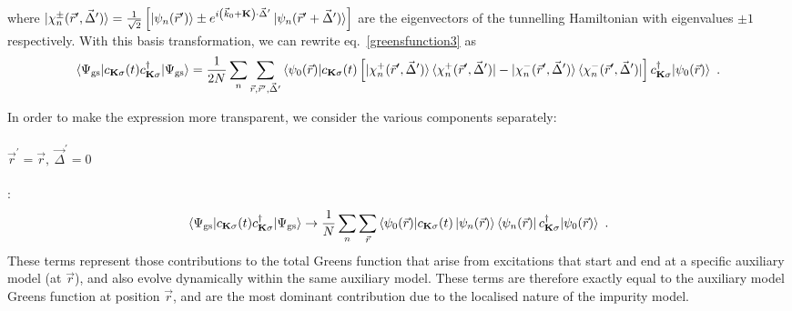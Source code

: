 \documentclass[reprint,hidelinks,onecolumn]{revtex4-2}
\begin{document}
where \(\ket{\chi_n^\pm(\vec r^\prime,\vec\Delta^\prime)} = \frac{1}{\sqrt 2}\left[\ket{\psi_n(\vec r^\prime)} \pm e^{i\left( \vec k_0 + {\bf K} \right) \cdot\vec\Delta^\prime}\ket{\psi_n(\vec r^\prime + \vec\Delta^\prime)}\right] \) are the eigenvectors of the tunnelling Hamiltonian with eigenvalues \(\pm 1\) respectively. With this basis transformation, we can rewrite eq.~\ref{greensfunction3} as
\begin{equation}\begin{aligned}
		\braket{\Psi_\text{gs} | c_{{\bf K}\sigma}(t) c^\dagger_{{\bf K}\sigma} | \Psi_\text{gs}} = \frac{1}{2N}\sum_n\sum_{\vec r,\vec r^\prime,\vec \Delta^\prime} \braket{\psi_{0}(\vec r) | c_{{\bf K}\sigma}(t) \left[ \ket{\chi_n^+(\vec r^\prime,\vec\Delta^\prime)}\bra{\chi_n^+(\vec r^\prime,\vec\Delta^\prime)} - \ket{\chi_n^-(\vec r^\prime,\vec\Delta^\prime)}\bra{\chi_n^-(\vec r^\prime,\vec\Delta^\prime)}\right] c^\dagger_{{\bf K}\sigma} | \psi_{0}(\vec r)}~.
\end{aligned}\end{equation}

In order to make the expression more transparent, we consider the various components separately:
\paragraph{\(\vec r^\prime = \vec r,~\vec\Delta^\prime=0\)}:
\begin{equation}\begin{aligned}
		\braket{\Psi_\text{gs} | c_{{\bf K}\sigma}(t) c^\dagger_{{\bf K}\sigma} | \Psi_\text{gs}} \to \frac{1}{N}\sum_n\sum_{\vec r} \braket{\psi_{0}(\vec r) | c_{{\bf K}\sigma}(t) \ket{\psi_n(\vec r)}\bra{\psi_n(\vec r)} c^\dagger_{{\bf K}\sigma} | \psi_{0}(\vec r)} ~.
\end{aligned}\end{equation}
These terms represent those contributions to the total Greens function that arise from excitations that start and end at a specific auxiliary model (at \(\vec r\)), and also evolve dynamically within the same auxiliary model. These terms are therefore exactly equal to the auxiliary model Greens function at position \(\vec r\), and are the most dominant contribution due to the localised nature of the impurity model.
\end{document}
